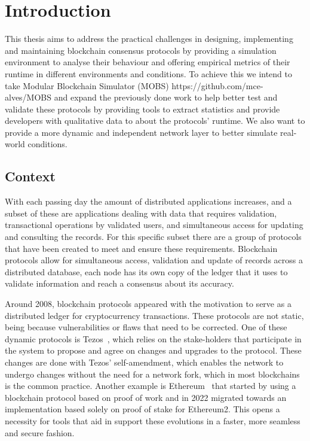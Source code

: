 
%

\chapter{Introduction}\label{cha:introduction}

This thesis aims to address the practical challenges in designing, implementing and maintaining blockchain consensus
protocols by providing a simulation environment to analyse their behaviour and offering empirical metrics of their runtime in
different environments and conditions. To achieve this we intend to take Modular Blockchain Simulator (MOBS) https://github.com/mce-alves/MOBS
and expand the previously done work to help better test and validate these protocols by providing tools to extract statistics and 
provide developers with qualitative data to about the protocols' runtime. We also want to provide a more dynamic and independent network layer
to better simulate real-world conditions.


\section{Context}\label{sub:context}
With each passing day the amount of distributed applications increases, and a subset of these are applications
dealing with data that requires validation, transactional operations by validated users, and simultaneous access for updating and
consulting the records. For this specific subset there are a group of protocols that have been created to meet and ensure
these requirements. Blockchain protocols allow for simultaneous access, validation and update of records across
a distributed database, each node has its own copy of the ledger that it uses to validate information and reach a consensus
about its accuracy.

Around 2008, blockchain protocols appeared with the motivation
to serve as a distributed ledger for cryptocurrency transactions. These protocols are not static, being because vulnerabilities 
or flaws that need to be corrected.
One of these dynamic protocols is Tezos~\cite{tezos}, which relies on the stake-holders that participate in the system to propose and
agree on changes and upgrades to the protocol. These changes are done with Tezos' self-amendment, which enables the network to undergo
changes without the need for a network fork, which in most blockchains is the common practice.
Another example is Ethereum~\cite{ethereum} that started by using a blockchain protocol based on proof
of work and in 2022 migrated towards an implementation based solely on proof of stake for Ethereum2.
This opens a necessity for tools that aid in support these evolutions in a faster, more seamless and secure fashion.

